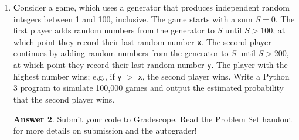 \documentclass[12pt]{article}
\renewcommand{\(}{\left(}
\renewcommand{\)}{\right)}
\theoremstyle{definition}
\newtheorem*{answer}{Answer}
\begin{document}
\begin{enumerate}
\begin{enumerate}[label=\alph*.]
    \item If the integers 1 through $n$ are inserted in arbitrary order into a BST (where each possible order is equally likely), what is the probability (as an expression in terms of $n$) that the resulting BST will have completely degenerate structure?
    \item Using your expression from part (a), determine the smallest value of $n$ for which the probability of forming a completely degenerate BST is less than 0.001 (i.e., 0.1\%).

    \end{enumerate}

    \begin{shaded}
    \begin{answer}

    \end{answer}
    \end{shaded}
    \newpage


\item \textbf Consider a game, which uses a generator that produces independent random integers between 1 and 100, inclusive. The game starts with a sum $S = 0$. The first player adds random numbers from the generator to $S$ until $S > 100$, at which point they record their last random number \texttt{x}. The second player continues by adding random numbers from the generator to $S$ until $S > 200$, at which point they record their last random number \texttt{y}. The player with the highest number wins; e.g., if \texttt{y} $>$ \texttt{x}, the second player wins. Write a Python 3 program to simulate 100,000 games and output the estimated probability that the second player wins.

    \begin{shaded}
    \begin{answer}
Submit your code to Gradescope. Read the Problem Set handout for more details on submission and the autograder!
    \end{answer}
    \end{shaded}
    \newpage



\end{enumerate}
\end{document}
